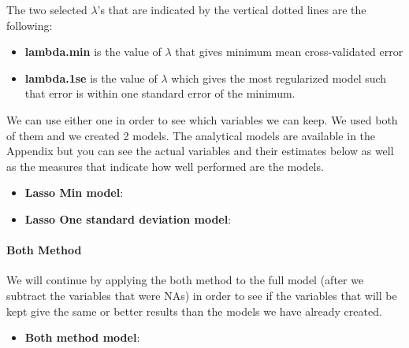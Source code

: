 \documentclass{article}
\begin{document}
The two selected $\lambda$’s that are indicated by the vertical dotted lines are the following:
\begin{itemize}
 \item \textbf{lambda.min} is the value of $\lambda$ that gives minimum mean cross-validated error
 \item \textbf{lambda.1se} is the value of $\lambda$ which gives the most regularized model such that error is within one standard error of the minimum.
 \end{itemize}  
We can use either one in order to see which variables we can keep. We used both of them and we created 2 models. The analytical models are available in the Appendix but you can see the actual variables and their estimates below as well as the measures that indicate how well performed are the models.
\begin{itemize}
\item \textbf{Lasso Min model}:


\item \textbf{Lasso One standard deviation model}:


\end{itemize}
\paragraph{Both Method}
We will continue by applying the both method to the full model (after we subtract the variables that were NAs) in order to see if the variables that will be kept give the same or better results than the models we have already created.
\begin{itemize}
\item \textbf{Both method model}:
\end{itemize}
\end{document}
